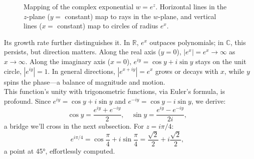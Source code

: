 \begin{figure}[H]
  \caption{Mapping of the complex exponential $w=e^z$. Horizontal lines in the $z$-plane ($y=$ constant) map to rays in the $w$-plane, and vertical lines ($x=$ constant) map to circles of radius $e^x$.}
  \label{fig:exp-mapping}
\end{figure}

\noindent Its growth rate further distinguishes it. In $\mathbb{R}$, $e^x$ outpaces polynomials; in $\mathbb{C}$, this persists, but direction matters. Along the real axis ($y = 0$), $|e^x| = e^x \to \infty$ as $x \to \infty$. Along the imaginary axis ($x = 0$), $e^{i y} = \cos y + i \sin y$ stays on the unit circle, $|e^{i y}| = 1$. In general directions, $|e^{x + i y}| = e^x$ grows or decays with $x$, while $y$ spins the phase—a balance of magnitude and motion. \\

\noindent This function’s unity with trigonometric functions, via Euler’s formula, is profound. Since $e^{i y} = \cos y + i \sin y$ and $e^{-i y} = \cos y - i \sin y$, we derive:
\[
\cos y = \frac{e^{i y} + e^{-i y}}{2}, \quad \sin y = \frac{e^{i y} - e^{-i y}}{2i},
\]
a bridge we’ll cross in the next subsection. For $z = i\pi/4$:
\[
e^{i \pi/4} = \cos \frac{\pi}{4} + i \sin \frac{\pi}{4} = \frac{\sqrt{2}}{2} + i \frac{\sqrt{2}}{2},
\]
a point at 45°, effortlessly computed.

